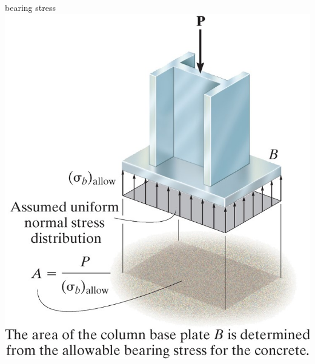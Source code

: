 \documentclass[
  letterpaper,
  ignorenonframetext,
  aspectratio=43,
  handout,
  12pt]{beamer}
\let\Oldincludegraphics\includegraphics
\renewcommand{\includegraphics}[2][]{\Oldincludegraphics[width=\textwidth,height=0.7\textheight,keepaspectratio]{#2}}
\begin{document}
\begin{frame}{bearing stress}
\protect\hypertarget{bearing-stress}{}
\includegraphics{../images/bearing-stress.jpg}
\end{frame}
\end{document}
